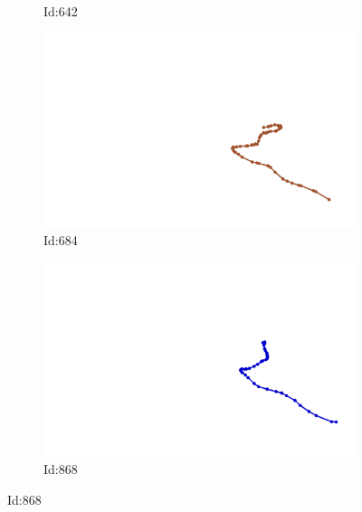 \documentclass[12pt,twoside]{report}
\begin{document}
\begin{figure}
\begin{subfigure}[b]{0.20\textwidth}
\caption{Id:642}
\end{subfigure}
\begin{subfigure}[b]{0.20\textwidth}
\centering
\includegraphics[width=\textwidth]{../../trajectories/684.png}
\caption{Id:684}
\end{subfigure}
\begin{subfigure}[b]{0.20\textwidth}
\centering
\includegraphics[width=\textwidth]{../../trajectories/868.png}
\caption{Id:868}
\end{subfigure}
\end{figure}
\end{document}
